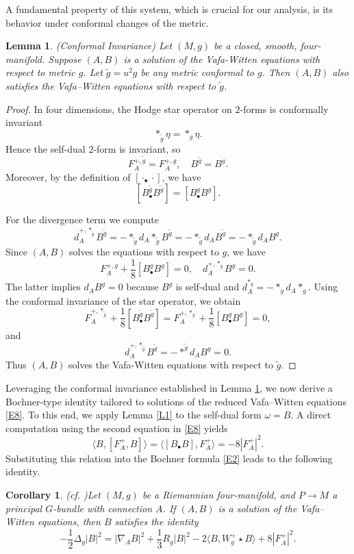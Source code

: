 \documentclass[12pt, twoside]{article}
\newtheorem{corollary}[theorem]{Corollary}
\newtheorem{lemma}[theorem]{Lemma}
\theoremstyle{definition}
\numberwithin{equation}{section}
\def \De {\Delta}
\def\na {\nabla}
\begin{document}
A fundamental property of this system, which is crucial for our analysis, is its behavior under conformal changes of the metric.
	\begin{lemma}\label{L3}(Conformal Invariance)
		Let $(M,g)$ be a closed, smooth, four-manifold. Suppose $(A,B)$ is a solution of the  Vafa-Witten equations with respect to metric $g$. Let $\tilde{g}=u^{2}g$ be any metric conformal to $g$. Then $(A,B)$ also satisfies the Vafa–Witten equations with respect to $\tilde{g}$.
	\end{lemma}
	\begin{proof}
In four dimensions, the Hodge star operator on $2$-forms is conformally invariant
$$\ast_{\tilde{g}}\eta =\ast_{g}\eta.$$
Hence the self-dual $2$-form is invariant, so
\[F_A^{+,\tilde{g}} = F_A^{+,g},\quad B^{\tilde{g}}=B^{g}.\]
Moreover, by the definition of $[\cdot_{\bullet}\cdot]$, we have
\[ [B^{\tilde{g}}_{\bullet}B^{\tilde{g}}]=[B^{g}_{\bullet}B^{g}].\]

For the divergence term we compute
\[d_{A}^{+,\ast_{\tilde{g}}}B^{\tilde{g}}=-\ast_{\tilde{g}}d_{A}\ast_{\tilde{g}}B^{\tilde{g}}=-\ast_{\tilde{g}}d_{A}B^{\tilde{g}}=-\ast_{\tilde{g}}d_{A}B^{g}.\]
Since $(A,B)$ solves the equations with respect to $g$, we have
$$F_{A}^{+,g}+\frac{1}{8}[B^{g}_{\bullet} B^{g}]=0,\quad d_{A}^{+,\ast_{g}}B^{g}=0.$$
The latter implies $d_{A}B^{g}=0$ because $B^{g}$ is self‑dual and $d_{A}^{\ast_{g}}=-\ast_{g}d_{A}\ast_{g}$. Using the conformal invariance of the star operator, we obtain
		\[
		F_{A}^{+,\ast_{\tilde{g}}}+ \frac{1}{8}[B^{\tilde{g}}_{\bullet}B^{\tilde{g}}] =F_{A}^{+,\ast_{g}}+ \frac{1}{8}[B^{g}_{\bullet}B^{g}] = 0,
		\]
		and
		\[
		d_{A}^{+,\ast_{\tilde{g}}}B^{\tilde{g}}=-\ast^{\tilde{g}}d_{A}B^{g}=0.
		\]
		Thus $(A,B)$ solves the Vafa-Witten equations with respect to $\tilde{g}$. 
	\end{proof}

Leveraging the conformal invariance established in Lemma \ref{L3},
 we now derive a Bochner-type identity tailored to solutions of the reduced Vafa--Witten equations \eqref{E8}. 
 To this end, we apply Lemma \ref{L1} to the self-dual form \(\omega = B\). 
A direct computation using the second equation in \eqref{E8} yields
\[\langle B,[F^{+}_{A},B]\rangle=\langle [B_{\bullet}B],F_{A}^{+}\rangle=-8|F^{+}_{A}|^{2}. \]
Substituting this relation into the Bochner formula \eqref{E2} leads to the following identity.

\begin{corollary}(cf. \cite[Section 3.1]{Mar10})\label{C1}
	Let $(M,g)$ be a Riemannian four-manifold, and $P\rightarrow M$ a principal $G$-bundle with connection $A$.
	 If $(A,B)$ is a solution of the Vafa--Witten equations, then $B$ satisfies the identity
	\begin{equation}
	-\frac{1}{2}\De_{g}|B|^{2}=|\na_{A}B|^{2}+\frac{1}{3}R_{g}|B|^{2}-2\langle B,W_{g}^{+}\star B\rangle+8|F_{A}^{+}|^{2}.
	\end{equation}
\end{corollary}
\end{document}
